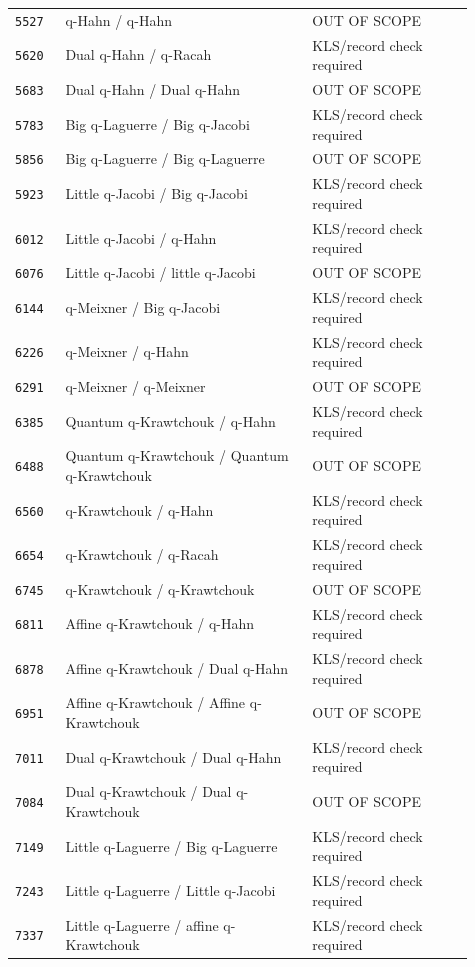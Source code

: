 \documentclass[11pt]{article}
\begin{document}
\begin{longtable}{@{}p{0.10\linewidth}p{0.49\linewidth}p{0.32\linewidth}@{}}
\texttt{5527} & q-Hahn / q-Hahn & OUT OF SCOPE \\
\texttt{5620} & Dual q-Hahn / q-Racah & KLS/record check required \\
\texttt{5683} & Dual q-Hahn / Dual q-Hahn & OUT OF SCOPE \\
\texttt{5783} & Big q-Laguerre / Big q-Jacobi & KLS/record check required \\
\texttt{5856} & Big q-Laguerre / Big q-Laguerre & OUT OF SCOPE \\
\texttt{5923} & Little q-Jacobi / Big q-Jacobi & KLS/record check required \\
\texttt{6012} & Little q-Jacobi / q-Hahn & KLS/record check required \\
\texttt{6076} & Little q-Jacobi / little q-Jacobi & OUT OF SCOPE \\
\texttt{6144} & q-Meixner / Big q-Jacobi & KLS/record check required \\
\texttt{6226} & q-Meixner / q-Hahn & KLS/record check required \\
\texttt{6291} & q-Meixner / q-Meixner & OUT OF SCOPE \\
\texttt{6385} & Quantum q-Krawtchouk / q-Hahn & KLS/record check required \\
\texttt{6488} & Quantum q-Krawtchouk / Quantum q-Krawtchouk & OUT OF SCOPE \\
\texttt{6560} & q-Krawtchouk / q-Hahn & KLS/record check required \\
\texttt{6654} & q-Krawtchouk / q-Racah & KLS/record check required \\
\texttt{6745} & q-Krawtchouk / q-Krawtchouk & OUT OF SCOPE \\
\texttt{6811} & Affine q-Krawtchouk / q-Hahn & KLS/record check required \\
\texttt{6878} & Affine q-Krawtchouk / Dual q-Hahn & KLS/record check required \\
\texttt{6951} & Affine q-Krawtchouk / Affine q-Krawtchouk & OUT OF SCOPE \\
\texttt{7011} & Dual q-Krawtchouk / Dual q-Hahn & KLS/record check required \\
\texttt{7084} & Dual q-Krawtchouk / Dual q-Krawtchouk & OUT OF SCOPE \\
\texttt{7149} & Little q-Laguerre / Big q-Laguerre & KLS/record check required \\
\texttt{7243} & Little q-Laguerre / Little q-Jacobi & KLS/record check required \\
\texttt{7337} & Little q-Laguerre / affine q-Krawtchouk & KLS/record check required \\

\end{longtable}
\end{document}
